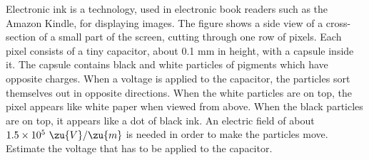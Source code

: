 Electronic ink is a technology, used in electronic book readers such
as the Amazon Kindle, for displaying images. The figure shows a side
view of a cross-section of a small part of the screen, cutting through one row of
pixels.  Each pixel consists of a tiny capacitor, about 0.1 mm in
height, with a capsule inside it. The capsule contains black and white
particles of pigments which have opposite charges. When a voltage is
applied to the capacitor, the particles sort themselves out in
opposite directions. When the white particles are on top, the pixel
appears like white paper when viewed from above. When the black
particles are on top, it appears like a dot of black ink. An electric
field of about $1.5\times10^5\ \zu{V}/\zu{m}$ is needed in order to
make the particles move. Estimate the voltage that has to be applied
to the capacitor.\answercheck
